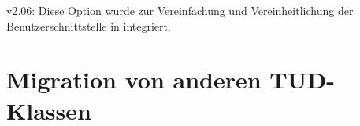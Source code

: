 \begin{Obsolete}{v2.06:}{%
}
\printobsoletelist%
%
Diese Option wurde zur Vereinfachung und Vereinheitlichung der 
Benutzerschnittstelle in  integriert.
\end{Obsolete}



\section[%
  Das Paket \PackageRaw{tudscrcomp}{\BooleanFalse}
  -- Migration von anderen TUD-Klassen%
]{%
  Migration von anderen TUD-Klassen%
}
